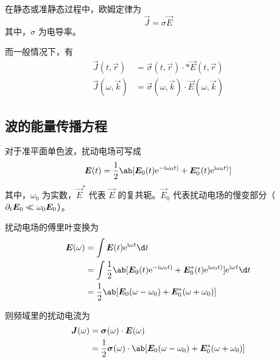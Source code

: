 在静态或准静态过程中，欧姆定律为
\begin{equation}
\vec{J} = \sigma \vec{E}
\end{equation}
其中，$\sigma$ 为电导率。

而一般情况下，有
\begin{equation}\begin{aligned}
\vec{J}(t, \vec{r}) &= \vec{\sigma}(t, \vec{r}) \cdot * \vec{E}(t, \vec{r}) \\
\vec{J}(\omega, \vec{k}) &= \vec{\sigma}(\omega, \vec{k}) \cdot \vec{E}(\omega, \vec{k})
\end{aligned}\end{equation}

\subsection{波的能量传播方程}

对于准平面单色波，扰动电场可写成
\begin{equation}
\vec{E}(t) = \frac{1}{2} \ab[
    \vec{E}_0(t) \eu^{-\im\omega_0 t)}
  + \vec{E}_0^*(t) \eu^{\im\omega_0 t)}
]
\end{equation}
其中，$\omega_0$ 为实数，$\vec{E}^*$ 代表 $\vec{E}$ 的复共轭。$\vec{E}_0$ 代表扰动电场的慢变部分（$\pdv{\bm{E}_0}!{t}\ll\omega_0\bm{E}_0$）。

扰动电场的傅里叶变换为
\begin{equation}\begin{aligned}
\vec{E}(\omega) &= \int \vec{E}(t) \eu^{\im \omega t} \d t \\
&= \int \frac{1}{2} \ab[
    \vec{E}_0(t) \eu^{-\im\omega_0 t)}
  + \vec{E}_0^*(t) \eu^{\im\omega_0 t)}
] \eu^{\im \omega t} \d t \\
&= \frac{1}{2} \ab[
    \vec{E}_0(\omega - \omega_0)
  + \vec{E}_0^*(\omega + \omega_0)
]
\end{aligned}\end{equation}

则频域里的扰动电流为
\begin{equation}\begin{aligned}
\vec{J}(\omega) &= \vec{\sigma}(\omega) \cdot \vec{E}(\omega) \\
&= \frac{1}{2} \vec{\sigma}(\omega) \cdot \ab[
    \vec{E}_0(\omega - \omega_0)
  + \vec{E}_0^*(\omega + \omega_0)
]
\end{aligned}\end{equation}

